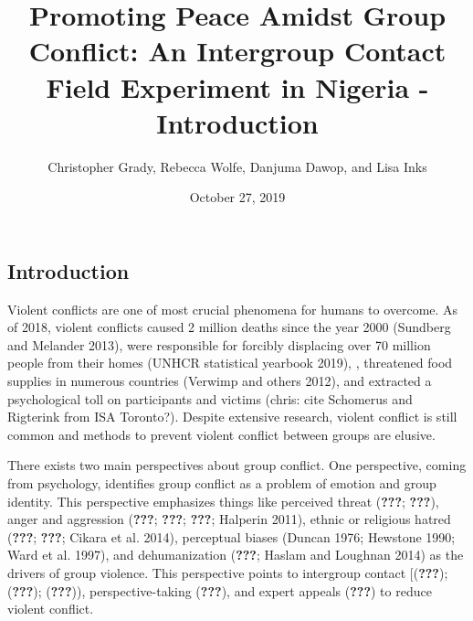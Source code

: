 \documentclass[11pt]{article}
\title{Promoting Peace Amidst Group Conflict: An Intergroup Contact Field
Experiment in Nigeria - Introduction}
\author{
Christopher Grady, Rebecca Wolfe, Danjuma Dawop, and Lisa Inks
}
\date{October 27, 2019}
\begin{document}
\VerbatimFootnotes

%
%
%
%
%
%
%
%
%
%

\maketitle

\hypertarget{introduction}{%
\subsection{Introduction}\label{introduction}}

Violent conflicts are one of most crucial phenomena for humans to
overcome. As of 2018, violent conflicts caused 2 million deaths since
the year 2000 (Sundberg and Melander 2013), were responsible for
forcibly displacing over 70 million people from their homes (UNHCR
statistical yearbook 2019), , threatened food supplies in numerous
countries (Verwimp and others 2012), and extracted a psychological toll
on participants and victims (chris: cite Schomerus and Rigterink from
ISA Toronto?). Despite extensive research, violent conflict is still
common and methods to prevent violent conflict between groups are
elusive.

There exists two main perspectives about group conflict. One
perspective, coming from psychology, identifies group conflict as a
problem of emotion and group identity. This perspective emphasizes
things like perceived threat ({\textbf{???}}; {\textbf{???}}), anger and
aggression ({\textbf{???}}; {\textbf{???}}; {\textbf{???}}; Halperin
2011), ethnic or religious hatred ({\textbf{???}}; {\textbf{???}};
Cikara et al. 2014), perceptual biases (Duncan 1976; Hewstone 1990; Ward
et al. 1997), and dehumanization ({\textbf{???}}; Haslam and Loughnan
2014) as the drivers of group violence. This perspective points to
intergroup contact {[}({\textbf{???}}); ({\textbf{???}});
({\textbf{???}})), perspective-taking ({\textbf{???}}), and expert
appeals ({\textbf{???}}) to reduce violent conflict.
\end{document}
